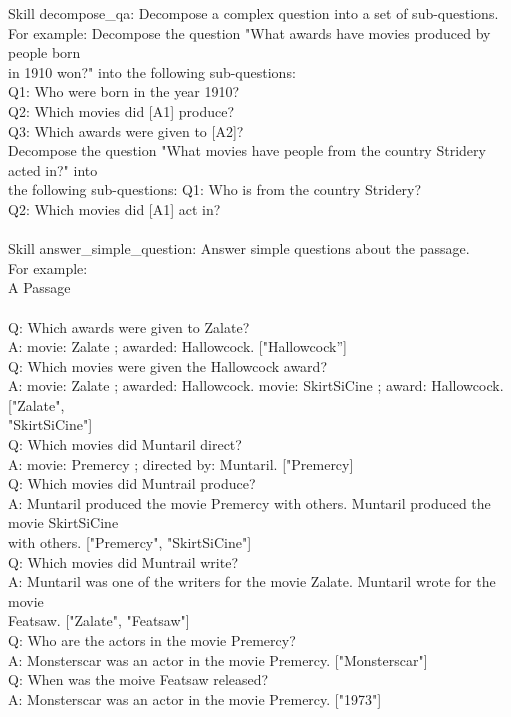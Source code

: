 \documentclass{article} \usepackage{arxiv}
\begin{document}
\newpage




\begin{tcolorbox}[title = {Skills for CommaQA-E task}, colback = Apricot!25!white, colframe = BrickRed!75!black] 
Skill decompose\_qa: Decompose a complex question into a set of sub-questions. \\ 
For example: Decompose the question "What awards have movies produced by people born \\ in 1910 won?"  
into the following sub-questions: \\
Q1: Who were born in the year 1910? \\
Q2: Which movies did [A1] produce? \\
Q3: Which awards were given to [A2]? \\
Decompose the question "What movies have people from the country Stridery acted in?" into  \\ 
the following sub-questions:
Q1: Who is from the country Stridery? \\
Q2: Which movies did [A1] act in? \\ \\

Skill answer\_simple\_question: Answer simple questions about the passage. \\
For example:  \\
A Passage \\  \\
Q: Which awards were given to Zalate? \\
A: movie: Zalate ; awarded: Hallowcock. ["Hallowcock”] \\
Q: Which movies were given the Hallowcock award? \\
A: movie: Zalate ; awarded: Hallowcock. movie: SkirtSiCine ; award: Hallowcock. ["Zalate", \\ "SkirtSiCine"]  \\
Q: Which movies did Muntaril direct? \\
A: movie: Premercy ; directed by: Muntaril. ["Premercy] \\
Q: Which movies did Muntrail produce? \\
A: Muntaril produced the movie Premercy with others. Muntaril produced the movie SkirtSiCine  \\ 
with others. ["Premercy", "SkirtSiCine"] \\
Q: Which movies did Muntrail write? \\
A: Muntaril was one of the writers for the movie Zalate. Muntaril wrote for the movie \\
Featsaw. ["Zalate", "Featsaw"] \\
Q: Who are the actors in the movie Premercy? \\ 
A: Monsterscar was an actor in the movie Premercy. ["Monsterscar"] \\
Q: When was the moive Featsaw released? \\
A: Monsterscar was an actor in the movie Premercy. ["1973"] \\
\end{tcolorbox}
\end{document}
